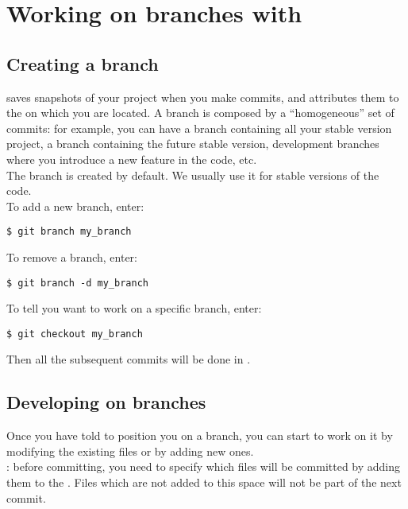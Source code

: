 \chapter{Working on branches with }\label{sec:useGit}

\section{Creating a branch}
 saves snapshots of your project when you make commits, and
 attributes them to the  on which you are
located. A branch is composed by a ``homogeneous'' set of commits: for example,
you can have a branch containing all your stable version project, a branch
containing the future stable version, development branches where you introduce
a new feature in the code, etc.\\

The branch  is created by default. We usually use it for stable
versions of the code.\\

To add a new branch, enter:
\begin{lstlisting}
$ git branch my_branch
\end{lstlisting}
To remove a branch, enter:
\begin{lstlisting}
$ git branch -d my_branch
\end{lstlisting}

To tell  you want to work on a specific branch, enter:
\begin{lstlisting}
$ git checkout my_branch
\end{lstlisting}
Then all the subsequent commits will be done in .

\section{Developing on branches}

Once you have told  to position you on a branch, you can start to
work on it by modifying the existing files or by adding new ones.\\

: before committing, you need to specify which files will
be committed by adding them to the . Files which are not
added to this space will not be part of the next commit.\\

